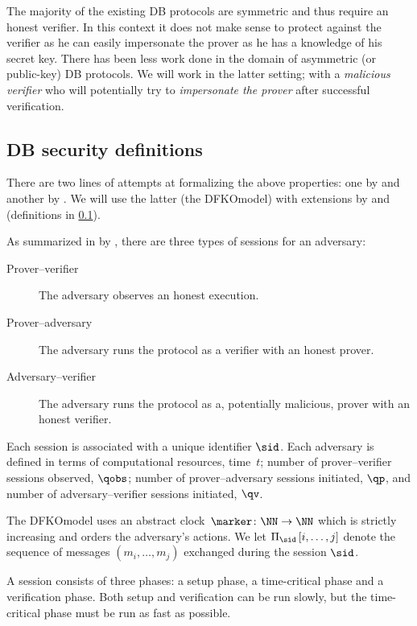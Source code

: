 The majority of the existing \ac{DB} protocols are symmetric and thus require an honest verifier.
In this context it does not make sense to protect against the verifier as he 
can easily impersonate the prover as he has a knowledge of his secret key.
There has been less work done in the domain of asymmetric (or public-key) \ac{DB} protocols.
We will work in the latter setting; with a \emph{malicious verifier} who will 
potentially try to \emph{impersonate the prover} after successful verification.

\subsection{\Acl*{DB} security definitions}%
\label{DB-definitions}

There are two lines of attempts at formalizing the above properties: one by 
\citet{DB-BMV} and another by \citet{DB-DFKO}.
We will use the latter (the \acs*{DFKOmodel}) with extensions by 
\textcite{FormalTerroristFraud} and \textcite{TREAD} (definitions in 
\cref{DB-definitions}).

As summarized in by \textcite{TREAD}, there are three types of sessions for an 
adversary:
\begin{description}
  \item[Prover--verifier] The adversary observes an honest execution.
  \item[Prover--adversary] The adversary runs the protocol as a verifier with 
    an honest prover.
  \item[Adversary--verifier] The adversary runs the protocol as a, potentially 
    malicious, prover with an honest verifier.
\end{description}
Each session is associated with a unique identifier \(\sid\).
Each adversary is defined in terms of
computational resources, time~\(t\);
number of prover--verifier sessions observed, \(\qobs\);
number of prover--adversary sessions initiated, \(\qp\), and
number of adversary--verifier sessions initiated, \(\qv\).

The \ac{DFKOmodel} uses an abstract clock~\(\marker\colon \NN\to \NN\) which is 
strictly increasing and orders the adversary's actions.
We let
\(\Xscript{\sid}{i, \dotsc, j}\)
denote the sequence of messages
\((m_i, \dotsc, m_j)\)
exchanged during the session \(\sid\).

A session consists of three phases: a setup phase, a time-critical phase and a 
verification phase.
Both setup and verification can be run slowly, but the time-critical phase must 
be run as fast as possible.

